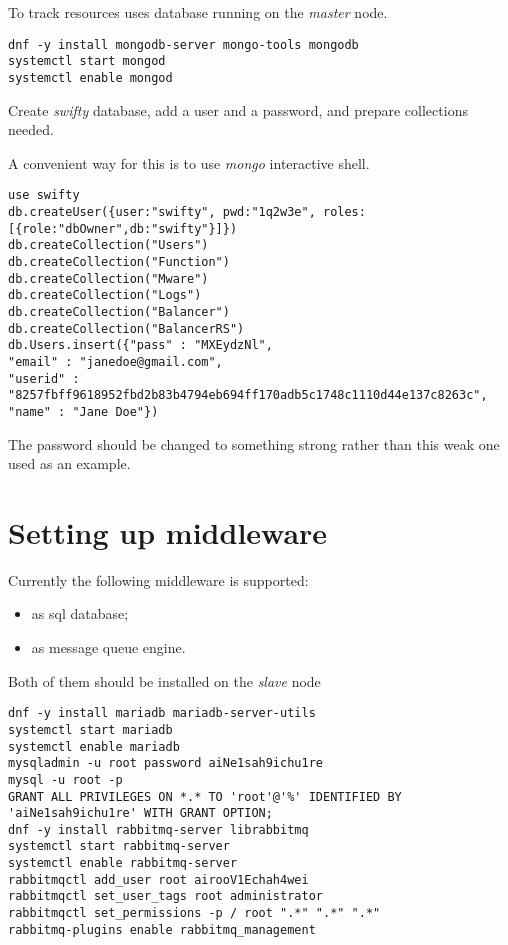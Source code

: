 To track resources  uses
 database
running on the \emph{master} node.

\begin{lstlisting}
dnf -y install mongodb-server mongo-tools mongodb
systemctl start mongod
systemctl enable mongod
\end{lstlisting}

Create \emph{swifty} database, add a user and a password,
and prepare collections needed.

A convenient way for this is to use \emph{mongo} interactive shell.

\begin{lstlisting}
use swifty
db.createUser({user:"swifty", pwd:"1q2w3e", roles:[{role:"dbOwner",db:"swifty"}]})
db.createCollection("Users")
db.createCollection("Function")
db.createCollection("Mware")
db.createCollection("Logs")
db.createCollection("Balancer")
db.createCollection("BalancerRS")
db.Users.insert({"pass" : "MXEydzNl",
"email" : "janedoe@gmail.com",
"userid" : "8257fbff9618952fbd2b83b4794eb694ff170adb5c1748c1110d44e137c8263c",
"name" : "Jane Doe"})
\end{lstlisting}

The password should be changed to something strong rather than
this weak one used as an example.

\section{Setting up middleware}
\label{sec:setup-mware}

Currently the following middleware is supported:
\begin{itemize}
\item{ as sql database;}
\item{ as message queue engine.}
\end{itemize}

Both of them should be installed on the \emph{slave} node

\begin{lstlisting}
dnf -y install mariadb mariadb-server-utils
systemctl start mariadb
systemctl enable mariadb
mysqladmin -u root password aiNe1sah9ichu1re
mysql -u root -p
GRANT ALL PRIVILEGES ON *.* TO 'root'@'%' IDENTIFIED BY 'aiNe1sah9ichu1re' WITH GRANT OPTION;
dnf -y install rabbitmq-server librabbitmq
systemctl start rabbitmq-server
systemctl enable rabbitmq-server
rabbitmqctl add_user root airooV1Echah4wei
rabbitmqctl set_user_tags root administrator
rabbitmqctl set_permissions -p / root ".*" ".*" ".*"
rabbitmq-plugins enable rabbitmq_management
\end{lstlisting}

